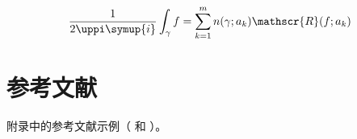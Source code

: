 \begin{equation}
  \frac{1}{2 \uppi \symup{i}} \int_\gamma f = \sum_{k=1}^m n(\gamma; a_k) \mathscr{R}(f; a_k)
  \label{eq:appendix-equation}
\end{equation}


\section{参考文献}

附录中的参考文献示例（\cite{carlson1981two} 和 \cite{carlson1981two,taylor1983scanning,taylor1981study}）。

\printbibliography
